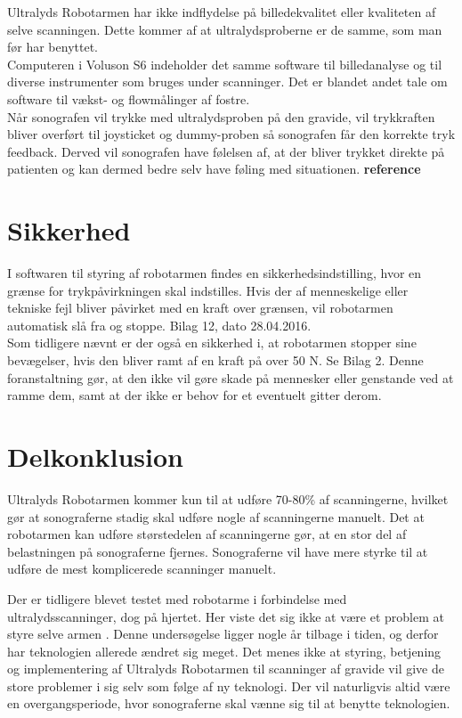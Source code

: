 Ultralyds Robotarmen har ikke indflydelse på billedekvalitet eller kvaliteten af selve scanningen. Dette kommer af at ultralydsproberne er de samme, som man før har benyttet. \\
Computeren i Voluson S6 indeholder det samme software til billedanalyse og til diverse instrumenter som bruges under scanninger. Det er blandet andet tale om software til vækst- og flowmålinger af fostre.   \\
Når sonografen vil trykke med ultralydsproben på den gravide, vil trykkraften bliver overført til joysticket og dummy-proben så sonografen får den korrekte tryk feedback. Derved vil sonografen have følelsen af, at der bliver trykket direkte på patienten og kan dermed bedre selv have føling med situationen. \textbf{reference} 

\section{Sikkerhed}
I softwaren til styring af robotarmen findes en sikkerhedsindstilling, hvor en grænse for trykpåvirkningen skal indstilles. Hvis der af menneskelige eller tekniske fejl bliver påvirket med en kraft over grænsen, vil robotarmen automatisk slå fra og stoppe. Bilag 12, dato 28.04.2016. \\
Som tidligere nævnt er der også en sikkerhed i, at robotarmen stopper sine bevægelser, hvis den bliver ramt af en kraft på over 50 N. Se Bilag 2. Denne foranstaltning gør, at den ikke vil gøre skade på mennesker eller genstande ved at ramme dem, samt at der ikke er behov for et eventuelt gitter derom. 

\section{Delkonklusion}
Ultralyds Robotarmen kommer kun til at udføre 70-80\% af scanningerne, hvilket gør at sonograferne stadig skal udføre nogle af scanningerne manuelt. Det at robotarmen kan udføre størstedelen af scanningerne gør, at en stor del af belastningen på sonograferne fjernes. Sonograferne vil have mere styrke til at udføre de mest komplicerede scanninger manuelt.

Der er tidligere blevet testet med robotarme i forbindelse med ultralydsscanninger, dog på hjertet. Her viste det sig ikke at være et problem at styre selve armen \cite{Hjerterobot}. Denne undersøgelse ligger nogle år tilbage i tiden, og derfor har teknologien allerede ændret sig meget. Det menes ikke at styring, betjening og implementering af Ultralyds Robotarmen til scanninger af gravide vil give de store problemer i sig selv som følge af ny teknologi. Der vil naturligvis altid være en overgangsperiode, hvor sonograferne skal vænne sig til at benytte teknologien. 